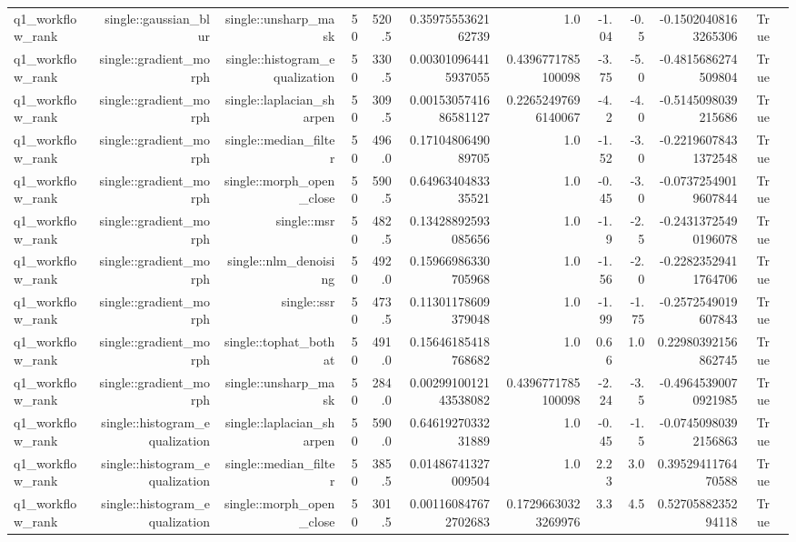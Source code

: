 \begin{tabular}{lrrrrrrrrrrr}
q1\_workflow\_rank & single::gaussian\_blur & single::unsharp\_mask & 50 & 520.5 & 0.3597555362162739 & 1.0 & -1.04 & -0.5 & -0.15020408163265306 & True &  \\
q1\_workflow\_rank & single::gradient\_morph & single::histogram\_equalization & 50 & 330.5 & 0.003010964415937055 & 0.4396771785100098 & -3.75 & -5.0 & -0.4815686274509804 & True &  \\
q1\_workflow\_rank & single::gradient\_morph & single::laplacian\_sharpen & 50 & 309.5 & 0.0015305741686581127 & 0.22652497696140067 & -4.2 & -4.0 & -0.5145098039215686 & True &  \\
q1\_workflow\_rank & single::gradient\_morph & single::median\_filter & 50 & 496.0 & 0.1710480649089705 & 1.0 & -1.52 & -3.0 & -0.22196078431372548 & True &  \\
q1\_workflow\_rank & single::gradient\_morph & single::morph\_open\_close & 50 & 590.5 & 0.6496340483335521 & 1.0 & -0.45 & -3.0 & -0.07372549019607844 & True &  \\
q1\_workflow\_rank & single::gradient\_morph & single::msr & 50 & 482.5 & 0.13428892593085656 & 1.0 & -1.9 & -2.5 & -0.24313725490196078 & True &  \\
q1\_workflow\_rank & single::gradient\_morph & single::nlm\_denoising & 50 & 492.0 & 0.15966986330705968 & 1.0 & -1.56 & -2.0 & -0.22823529411764706 & True &  \\
q1\_workflow\_rank & single::gradient\_morph & single::ssr & 50 & 473.5 & 0.11301178609379048 & 1.0 & -1.99 & -1.75 & -0.2572549019607843 & True &  \\
q1\_workflow\_rank & single::gradient\_morph & single::tophat\_bothat & 50 & 491.0 & 0.15646185418768682 & 1.0 & 0.66 & 1.0 & 0.22980392156862745 & True &  \\
q1\_workflow\_rank & single::gradient\_morph & single::unsharp\_mask & 50 & 284.0 & 0.0029910012143538082 & 0.4396771785100098 & -2.24 & -3.5 & -0.49645390070921985 & True &  \\
q1\_workflow\_rank & single::histogram\_equalization & single::laplacian\_sharpen & 50 & 590.0 & 0.6461927033231889 & 1.0 & -0.45 & -1.5 & -0.07450980392156863 & True &  \\
q1\_workflow\_rank & single::histogram\_equalization & single::median\_filter & 50 & 385.5 & 0.01486741327009504 & 1.0 & 2.23 & 3.0 & 0.3952941176470588 & True &  \\
q1\_workflow\_rank & single::histogram\_equalization & single::morph\_open\_close & 50 & 301.5 & 0.001160847672702683 & 0.17296630323269976 & 3.3 & 4.5 & 0.5270588235294118 & True &  \\

\end{tabular}
